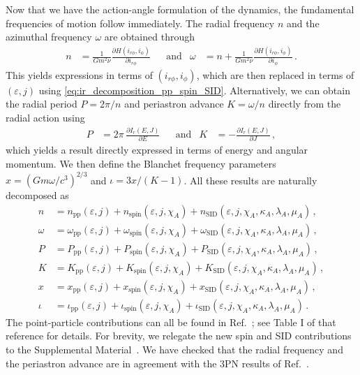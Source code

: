 \documentclass[prd,superscriptaddress,preprintnumbers,tightenlines,nofootinbib, eqsecnum]{revtex4-2}
\begin{document}
Now that we have the action-angle formulation of the dynamics, the fundamental frequencies of motion follow immediately. The radial frequency $n$ and the azimuthal frequency $\omega$ are obtained through
\begin{align} \label{eq:n_omega_from_Delaunay_Hamiltonian}
    n &= \frac{1}{G m^2  \nu} \frac{\partial H(i_{r\phi},i_\phi)}{\partial i_{r\phi}} &&\text{and}& \omega &= n+\frac{1}{G m^2 \nu} \frac{\partial H(i_{r\phi},i_\phi)}{\partial i_{\phi}} \,.
\end{align}
This yields expressions in terms of $(i_{r\phi},i_\phi)$, which are then replaced in terms of $(\varepsilon,j)$ using \eqref{eq:ir_decomposition_pp_spin_SID}. Alternatively, we can obtain the radial period $P = 2\pi/n$ and periastron advance $K=\omega/n$ directly from the radial action using
\begin{align}
    \label{eq:P_K_from_Ir}
    P &= 2\pi \,\frac{\partial I_r(E,J)}{\partial E} &&\text{and}&  K &= - \frac{\partial I_r(E,J)}{\partial J} \,,
\end{align}
which yields a result directly expressed in terms of energy and angular momentum.  We then define the Blanchet frequency parameters $x=(Gm\omega/c^3)^{2/3}$ and $\iota = 3x/(K-1)$. All these results are naturally decomposed as 
\begin{subequations}\label{eq:n_omega_etc_decomposition_pp_spin_SID}
    \begin{align} 
    \label{seq:n_decomposition_pp_spin_SID}
    n&=n_\text{pp}(\varepsilon,j)+n_\text{spin}(\varepsilon,j,\chi_A)+n_\text{SID}(\varepsilon,j,\chi_A,\kappa_A,\lambda_A,\mu_A)\,,\\
    \label{seq:omega_decomposition_pp_spin_SID}
    \omega&=\omega_\text{pp}(\varepsilon,j)+\omega_\text{spin}(\varepsilon,j,\chi_A)+\omega_\text{SID}(\varepsilon,j,\chi_A,\kappa_A,\lambda_A,\mu_A)\,,\\
    \label{seq:P_decomposition_pp_spin_SID}
    P&=P_\text{pp}(\varepsilon,j)+P_\text{spin}(\varepsilon,j,\chi_A)+P_\text{SID}(\varepsilon,j,\chi_A,\kappa_A,\lambda_A,\mu_A)\,,\\
    \label{seq:K_decomposition_pp_spin_SID}
    K&=K_\text{pp}(\varepsilon,j)+K_\text{spin}(\varepsilon,j,\chi_A)+K_\text{SID}(\varepsilon,j,\chi_A,\kappa_A,\lambda_A,\mu_A)\,,\\
    \label{seq:x_decomposition_pp_spin_SID}
    x&=x_\text{pp}(\varepsilon,j)+x_\text{spin}(\varepsilon,j,\chi_A)+x_\text{SID}(\varepsilon,j,\chi_A,\kappa_A,\lambda_A,\mu_A)\,,\\
    \label{seq:iota_decomposition_pp_spin_SID}
    \iota&=\iota_\text{pp}(\varepsilon,j)+\iota_\text{spin}(\varepsilon,j,\chi_A)+\iota_\text{SID}(\varepsilon,j,\chi_A,\kappa_A,\lambda_A,\mu_A) \,.
\end{align}
\end{subequations}
The point-particle contributions can all be found in Ref.~\cite{Trestini:2025yyc}; see Table I of that reference for details. For brevity, we relegate the new spin and SID contributions to the Supplemental Material~\cite{Supplemental}. We have checked that the radial frequency and the periastron advance are in agreement with the 3PN results of Ref.~\cite{Henry:2023tka}.
\end{document}
